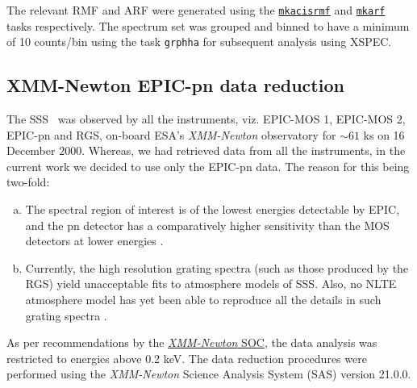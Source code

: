     	The relevant RMF and ARF were generated using the %
    	\href{https://cxc.cfa.harvard.edu/ciao/ahelp/mkacisrmf.html}{\texttt{mkacisrmf}} and %
    	\href{https://cxc.cfa.harvard.edu/ciao/ahelp/mkarf.html}{\texttt{mkarf}} tasks respectively. The spectrum set was grouped and binned to have a minimum of 10 counts/bin using the task \texttt{grphha} for subsequent analysis using XSPEC.
    	
    \subsection{XMM-Newton EPIC-pn data reduction}
    	The SSS \source\ was observed by all the instruments, viz. EPIC-MOS 1, EPIC-MOS 2, EPIC-pn and RGS, on-board ESA's \textit{XMM-Newton} observatory for $\sim 61$ ks on 16 December 2000. Whereas, we had retrieved data from all the instruments, in the current work we decided to use only the EPIC-pn data. The reason for this being two-fold:
    	\begin{enumerate}[a)]
    		\item The spectral region of interest is of the lowest energies detectable by EPIC, and the pn detector has a comparatively higher sensitivity than the MOS detectors at lower energies \cite{stecchini2023revisiting,mateos2009statistical}.
    		\item Currently, the high resolution grating spectra (such as those produced by the RGS) yield unacceptable fits to atmosphere models of SSS. Also, no NLTE atmosphere model has yet been able to reproduce all the details in such grating spectra \cite{ness2020complications}.
    	\end{enumerate}
    	As per recommendations by the %
    	\href{https://xmmweb.esac.esa.int/docs/documents/CAL-TN-0018.pdf}{\textit{XMM-Newton} SOC}, the data analysis was restricted to energies above 0.2 keV. The data reduction procedures were performed using the \textit{XMM-Newton} Science Analysis System (SAS) version 21.0.0.
    
